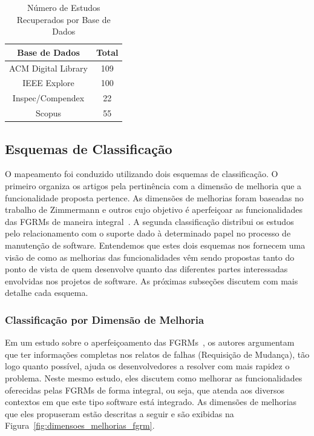 \begin{table}[htb]
	\centering
	\begin{tabular}{cc}
		\toprule
		\textbf{Base de Dados} & \textbf{Total} \\
		\midrule
	   	ACM Digital Library & 109\\
	   	IEEE Explore        & 100\\
		Inspec/Compendex    & 22 \\ 
		Scopus              & 55 \\
		\bottomrule
	\end{tabular}
	\caption{Número de Estudos Recuperados por Base de Dados}
\label{tab:estudos-por-base-dados}
\end{table}

\subsection{Esquemas de Classificação}
\label{subsec:map-esquemas-classificacao}

O mapeamento foi conduzido utilizando dois esquemas de classificação. O primeiro
organiza os artigos pela pertinência com a dimensão de melhoria que a
funcionalidade proposta pertence. As dimensões de melhorias foram baseadas no
trabalho de Zimmermann e outros cujo objetivo é aperfeiçoar as funcionalidades
das FGRMs de maneira integral~\cite{zimmermann2009improving}. A segunda
classificação distribui os estudos pelo relacionamento com o suporte dado à
determinado papel no processo de manutenção de software. Entendemos que estes
dois esquemas nos fornecem uma visão de como as melhorias das funcionalidades
vêm sendo propostas tanto do ponto de vista de quem desenvolve quanto das
diferentes partes interessadas envolvidas nos projetos de software.  As
pró\-xi\-mas subseções discutem com mais detalhe cada esquema.

\subsubsection{Classificação por Dimensão de Melhoria}
\label{subsubsec:map-esquema-suporte-problema}

Em um estudo sobre o aperfeiçoamento das FGRMs~\cite{zimmermann2009improving},
os autores argumentam que ter informações completas nos relatos de falhas
(Requisição de Mudança), tão logo quanto possível, ajuda os desenvolvedores a
resolver com mais rapidez o problema. Neste mesmo estudo, eles discutem como
melhorar as funcionalidades oferecidas pelas FGRMs de forma integral, ou seja,
que atenda aos diversos contextos em que este tipo software está integrado. As
dimensões de melhorias que eles propuseram estão descritas a seguir e são
exibidas na Figura~\ref{fig:dimensoes_melhorias_fgrm}.

